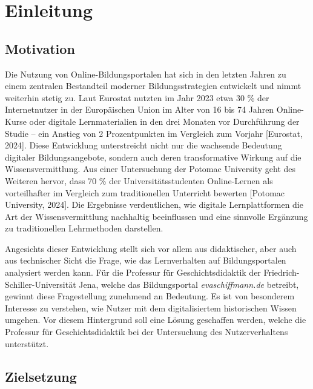 \chapter{Einleitung}
\label{ch:einleitung}

\section{Motivation}
\label{sec:motivation}

Die Nutzung von Online-Bildungsportalen hat sich in den letzten Jahren zu einem zentralen Bestandteil moderner Bildungsstrategien entwickelt und nimmt weiterhin stetig zu. Laut Eurostat nutzten im Jahr 2023 etwa 30 \% der Internetnutzer in der Europäischen Union im Alter von 16 bis 74 Jahren Online-Kurse oder digitale Lernmaterialien
in den drei Monaten vor Durchführung der Studie – ein Anstieg von 2 Prozentpunkten im Vergleich zum Vorjahr [Eurostat, 2024]. Diese Entwicklung unterstreicht nicht nur die wachsende Bedeutung digitaler Bildungsangebote, sondern auch deren transformative Wirkung auf die Wissensvermittlung. Aus einer Untersuchung der Potomac University geht des Weiteren hervor, dass 70 \% der Universitätsstudenten Online-Lernen als vorteilhafter im Vergleich zum traditionellen Unterricht bewerten [Potomac University, 2024]. Die Ergebnisse verdeutlichen, wie digitale Lernplattformen die Art der Wissensvermittlung nachhaltig beeinflussen und eine sinnvolle Ergänzung zu traditionellen Lehrmethoden darstellen.

Angesichts dieser Entwicklung stellt sich vor allem aus didaktischer, aber auch aus technischer Sicht die Frage, wie das Lernverhalten auf Bildungsportalen analysiert werden kann. Für die Professur für Geschichtsdidaktik der Friedrich-Schiller-Universität Jena, welche das Bildungsportal \textit{evaschiffmann.de} betreibt, gewinnt diese Fragestellung zunehmend an Bedeutung. Es ist von besonderem Interesse zu verstehen, wie Nutzer mit dem digitalisiertem historischen Wissen umgehen. Vor diesem Hintergrund soll eine Lösung geschaffen werden, welche die Professur für Geschichtsdidaktik bei der Untersuchung des Nutzerverhaltens unterstützt.

\section{Zielsetzung}
\label{sec:zielsetzung}


